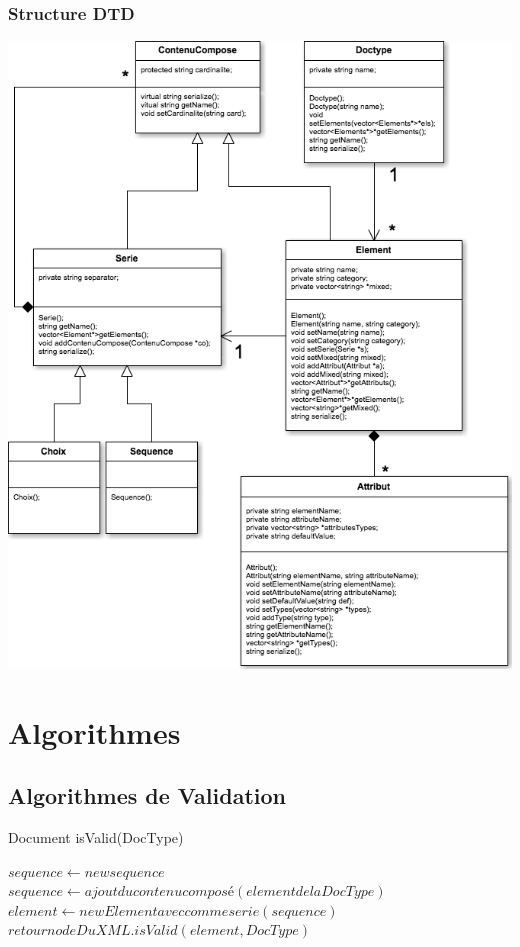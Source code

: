 \subsubsection{Structure DTD}
\medskip
\begin {center}
\includegraphics[width=\textwidth]{UMLDTD.png}
\end {center}
\medskip


\section{Algorithmes}

\subsection{Algorithmes de Validation}

\begin{algorithm}
\caption{Document isValid(DocType)}
\begin{algorithmic}
\STATE $sequence \leftarrow new sequence$
\STATE $sequence \leftarrow ajout du contenu composé (element de la DocType)$
\ENDFOR
\STATE $element \leftarrow new Element avec comme serie(sequence) $
\STATE $retour nodeDuXML.isValid(element,DocType)$
\end{algorithmic}
\end{algorithm}

